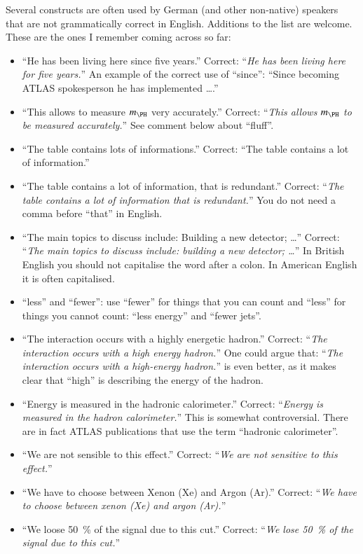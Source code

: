 Several constructs are often used by German (and other non-native) speakers
that are not grammatically correct in English.
Additions to the list are welcome.
These are the ones I remember coming across so far:
\begin{itemize}
\item \enquote{He has been living here since five years.}
  Correct: \enquote{\emph{He has been living here for five years.}}
  An example of the correct use of \enquote{since}:
  \enquote{Since becoming ATLAS spokesperson he has implemented \ldots.}
\item \enquote{This allows to measure \(m_{\PH}\) very accurately.}
  Correct: \enquote{\emph{This allows \(m_{\PH}\) to be measured accurately.}}
  See comment below about \enquote{fluff}.
\item \enquote{The table contains lots of informations.}
  Correct: \enquote{The table contains a lot of information.}
\item \enquote{The table contains a lot of information, that is redundant.}
  Correct: \enquote{\emph{The table contains a lot of information that is redundant.}}
  You do not need a comma before \enquote{that} in English.
\item \enquote{The main topics to discuss include: Building a new detector; \ldots}
  Correct: \enquote{\emph{The main topics to discuss include: building a new detector; \ldots}}
  In British English you should not capitalise the word after a colon.
  In American English it is often capitalised.
\item \enquote{less} and \enquote{fewer}: use \enquote{fewer} for things that you can count and
  \enquote{less} for things you cannot count: \enquote{less energy} and \enquote{fewer jets}.
\item \enquote{The interaction occurs with a highly energetic hadron.}
  Correct: \enquote{\emph{The interaction occurs with a high energy hadron.}}
  One could argue that: \enquote{\emph{The interaction occurs with a high-energy hadron.}}
  is even better, as it makes clear that \enquote{high} is describing the energy of the hadron.
\item \enquote{Energy is measured in the hadronic calorimeter.}
  Correct: \enquote{\emph{Energy is measured in the hadron calorimeter.}}
  This is somewhat controversial.
  There are in fact ATLAS publications that use the term \enquote{hadronic calorimeter}.
\item \enquote{We are not sensible to this effect.}
  Correct: \enquote{\emph{We are not sensitive to this effect.}}
\item \enquote{We have to choose between Xenon (Xe)  and Argon (Ar).}
  Correct: \enquote{\emph{We have to choose between xenon (Xe) and argon (Ar).}}
\item \enquote{We loose \SI{50}{\%} of the signal due to this cut.}
  Correct: \enquote{\emph{We lose \SI{50}{\%} of the signal due to this cut.}}
\end{itemize}

